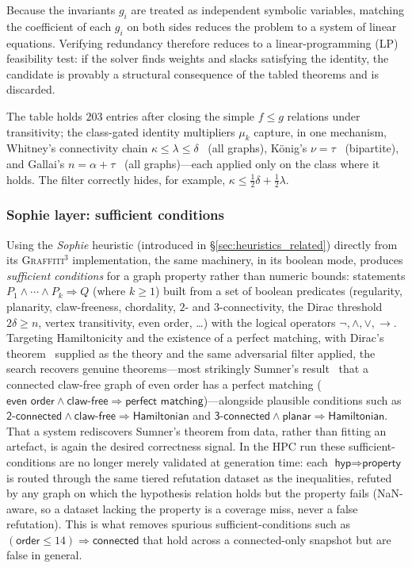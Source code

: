 \documentclass[]{ceurart}
\begin{document}
Because the invariants $g_i$ are treated as independent symbolic variables, matching the coefficient of each $g_i$ on both sides reduces the problem to a system of linear equations. Verifying redundancy therefore reduces to a linear-programming (LP) feasibility test: if the solver finds weights and slacks satisfying the identity, the candidate is provably a structural consequence of the tabled theorems and is discarded.

The table holds $203$ entries after closing the simple $f\le g$
relations under transitivity; the class-gated identity multipliers $\mu_k$ capture, in one
mechanism, Whitney's connectivity chain $\kappa\le\lambda\le\delta$~\cite{whitney1932congruent}
(all graphs), K\"onig's $\nu=\tau$~\cite{konig1931graphen} (bipartite), and
Gallai's $n=\alpha+\tau$~\cite{gallai1959uber} (all graphs)---each applied only on the class where
it holds. The filter correctly hides, for
example, $\kappa\le\tfrac12\delta+\tfrac12\lambda$.

\subsubsection{Sophie layer: sufficient conditions}
\label{sec:sophie}
Using the \emph{Sophie} heuristic (introduced in \S\ref{sec:heuristics_related}) directly from its \textsc{Graffiti}$^3$ implementation, the same machinery, in its boolean mode, produces \emph{sufficient conditions}
for a graph property rather than numeric bounds: statements
$P_1\wedge\cdots\wedge P_k\Rightarrow Q$ (where $k \ge 1$) built from a
set of boolean predicates (regularity, planarity, claw-freeness, chordality,
$2$- and $3$-connectivity, the Dirac threshold $2\delta\ge n$, vertex
transitivity, even order, \dots) with the logical operators
$\neg,\wedge,\vee,\rightarrow$. Targeting Hamiltonicity and the existence of a
perfect matching, with Dirac's theorem~\cite{dirac1952some} supplied as the
theory and the same
adversarial filter applied, the search recovers genuine theorems---most
strikingly Sumner's result~\cite{sumner1974graphs} that a connected claw-free
graph of even order has a
perfect matching ($\textsf{even order}\wedge\textsf{claw-free}\Rightarrow
\textsf{perfect matching}$)---alongside plausible conditions such as
$\textsf{2-connected}\wedge\textsf{claw-free}\Rightarrow\textsf{Hamiltonian}$
and $\textsf{3-connected}\wedge\textsf{planar}\Rightarrow\textsf{Hamiltonian}$.
That a system rediscovers Sumner's theorem from data, rather than fitting an
artefact, is again the desired correctness signal. In the HPC run these
sufficient-conditions are no longer merely validated at generation time: each
$\textsf{hyp}\Rightarrow\textsf{property}$ is routed through the same tiered
refutation dataset as the inequalities, refuted by any graph on which the
hypothesis relation holds but the property fails (NaN-aware, so a dataset lacking
the property is a coverage miss, never a false refutation). This is what removes
spurious sufficient-conditions such as
$(\textsf{order}\le14)\Rightarrow\textsf{connected}$ that hold across a
connected-only snapshot but are false in general.
\end{document}
